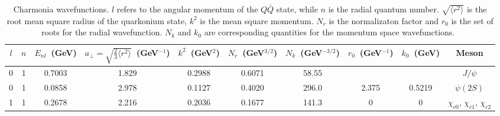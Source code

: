 \documentclass[article,showpacs,preprintnumbers,amsmath,amssymb]{revtex4}
\newcommand{\barQ}{{\bar{Q}}}
\begin{document}
\begin{table}[h]
\begin{tabular}{cccccccccc}
$l$ & $n$ & $E_{nl}$~(GeV) & $a_\perp=\sqrt{\frac{2}{3}\langle r^2\rangle}$~(GeV$^{-1}$) & $k^2$~(GeV$^2$) & $N_r$~(GeV$^{3/2}$)  &$N_k$~(GeV$^{-3/2}$)    & ${r_0}$~(GeV$^{-1}$) & ${k_0}$~(GeV) & Meson \\ 
\hline \hline
0  & 1  & 0.7003    & 1.829           & 0.2988         & 0.6071              & 58.55                 & { }                 & { }           & $J/\psi$         \\
0  & 1  & 0.0858    & 2.978           & 0.1127         & 0.4020              & 296.0                 & {2.375}             & {0.5219}      & $\psi(2S)$      \\
1  & 1  & 0.2678    & 2.216           & 0.2036         & 0.1677              & 141.3                 & {0}                 & {0}           & $\chi_{c0}$, $\chi_{c1}$, $\chi_{c2}$\\
\end{tabular}
\caption{Charmonia wavefunctions. $l$ refers to the angular momentum of the
$Q\barQ$ state, while $n$ is the radial quantum number. $\sqrt{\langle r^2\rangle}$ is the root mean square 
radius of the quarkonium state, $k^2$ is the mean square momentum. $N_r$ is the
normalizaton factor and ${r_0}$ is the set of roots for the radial
wavefunction. $N_k$ and ${k_0}$ are corresponding quantities for the momentum
space wavefunctions.~\label{table:Charm}}
\end{table}
\end{document}
